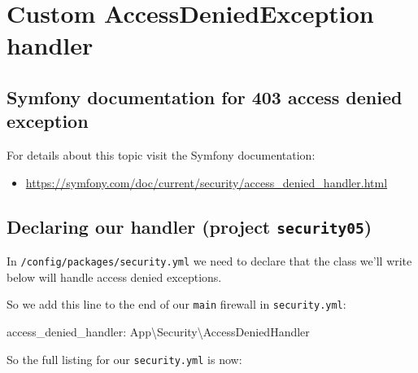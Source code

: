 \documentclass[a4paperpaper,openright]{book}
\newenvironment{Shaded}{}{}
\newcommand{\AttributeTok}[1]{\textcolor[rgb]{0.49,0.56,0.16}{#1}}
\newcommand{\FunctionTok}[1]{\textcolor[rgb]{0.02,0.16,0.49}{#1}}
\providecommand{\tightlist}{%
  \setlength{\itemsep}{0pt}\setlength{\parskip}{0pt}}
\begin{document}
\hypertarget{custom-accessdeniedexception-handler}{%
\chapter{Custom AccessDeniedException
handler}\label{custom-accessdeniedexception-handler}}

\hypertarget{symfony-documentation-for-403-access-denied-exception}{%
\section{Symfony documentation for 403 access denied
exception}\label{symfony-documentation-for-403-access-denied-exception}}

For details about this topic visit the Symfony documentation:

\begin{itemize}
\tightlist
\item
  \url{https://symfony.com/doc/current/security/access_denied_handler.html}
\end{itemize}

\hypertarget{declaring-our-handler-project-security05}{%
\section{\texorpdfstring{Declaring our handler (project
\texttt{security05})}{Declaring our handler (project security05)}}\label{declaring-our-handler-project-security05}}

In \texttt{/config/packages/security.yml} we need to declare that the
class we'll write below will handle access denied exceptions.

So we add this line to the end of our \texttt{main} firewall in
\texttt{security.yml}:

\begin{Shaded}
\begin{Highlighting}[]
    \FunctionTok{access_denied_handler:}\AttributeTok{ App\textbackslash{}Security\textbackslash{}AccessDeniedHandler}
\end{Highlighting}
\end{Shaded}

So the full listing for our \texttt{security.yml} is now:
\end{document}

